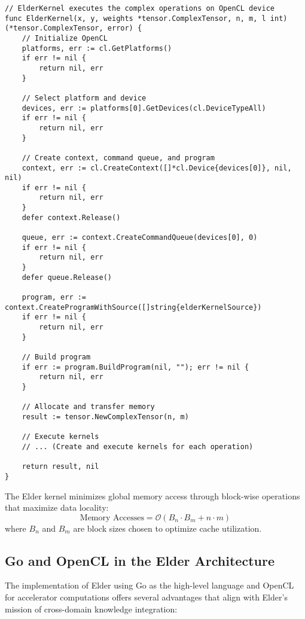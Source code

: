 \begin{verbatim}
// ElderKernel executes the complex operations on OpenCL device
func ElderKernel(x, y, weights *tensor.ComplexTensor, n, m, l int) (*tensor.ComplexTensor, error) {
    // Initialize OpenCL
    platforms, err := cl.GetPlatforms()
    if err != nil {
        return nil, err
    }
    
    // Select platform and device
    devices, err := platforms[0].GetDevices(cl.DeviceTypeAll)
    if err != nil {
        return nil, err
    }
    
    // Create context, command queue, and program
    context, err := cl.CreateContext([]*cl.Device{devices[0]}, nil, nil)
    if err != nil {
        return nil, err
    }
    defer context.Release()
    
    queue, err := context.CreateCommandQueue(devices[0], 0)
    if err != nil {
        return nil, err
    }
    defer queue.Release()
    
    program, err := context.CreateProgramWithSource([]string{elderKernelSource})
    if err != nil {
        return nil, err
    }
    
    // Build program
    if err := program.BuildProgram(nil, ""); err != nil {
        return nil, err
    }
    
    // Allocate and transfer memory
    result := tensor.NewComplexTensor(n, m)
    
    // Execute kernels
    // ... (Create and execute kernels for each operation)
    
    return result, nil
}
\end{verbatim}

\begin{proposition}
The Elder kernel minimizes global memory access through block-wise operations that maximize data locality:
\begin{equation}
\text{Memory Accesses} = \mathcal{O}(B_n \cdot B_m + n \cdot m)
\end{equation}
where $B_n$ and $B_m$ are block sizes chosen to optimize cache utilization.
\end{proposition}

\subsection{Go and OpenCL in the Elder Architecture}

The implementation of Elder using Go as the high-level language and OpenCL for accelerator computations offers several advantages that align with Elder's mission of cross-domain knowledge integration:

